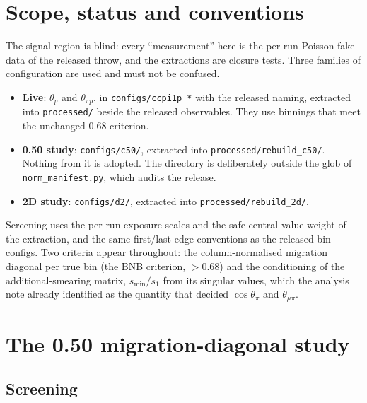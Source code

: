 \section{Scope, status and conventions}
\label{sec:scope}

The signal region is blind: every ``measurement'' here is the per-run Poisson fake data of the
released throw, and the extractions are closure tests. Three families of configuration are used and
must not be confused.
\begin{itemize}\itemsep2pt
  \item \textbf{Live}: $\theta_p$ and $\theta_{\pi p}$, in \texttt{configs/ccpi1p\_*} with the released
    naming, extracted into \texttt{processed/} beside the released observables. They use binnings that
    meet the unchanged $0.68$ criterion.
  \item \textbf{0.50 study}: \texttt{configs/c50/}, extracted into \texttt{processed/rebuild\_c50/}.
    Nothing from it is adopted. The directory is deliberately outside the glob of
    \texttt{norm\_manifest.py}, which audits the release.
  \item \textbf{2D study}: \texttt{configs/d2/}, extracted into \texttt{processed/rebuild\_2d/}.
\end{itemize}
Screening uses the per-run exposure scales and the safe central-value weight of the extraction, and
the same first/last-edge conventions as the released bin configs. Two criteria appear throughout: the
column-normalised migration diagonal per true bin (the BNB criterion, $>0.68$) and the conditioning
of the additional-smearing matrix, $s_{\min}/s_1$ from its singular values, which the analysis note
already identified as the quantity that decided $\cos\theta_\pi$ and $\theta_{\mu\pi}$.

\section{The 0.50 migration-diagonal study}
\label{sec:c50}

\subsection{Screening}

